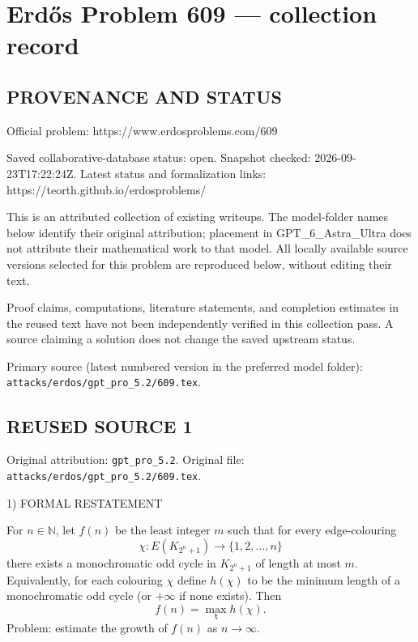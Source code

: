 \section*{Erd\H{o}s Problem 609 --- collection record}

\subsection*{PROVENANCE AND STATUS}
Official problem: https://www.erdosproblems.com/609

Saved collaborative-database status: open.
Snapshot checked: 2026-09-23T17:22:24Z.
Latest status and formalization links: https://teorth.github.io/erdosproblems/

This is an attributed collection of existing writeups. The model-folder names below identify their original attribution; placement in GPT\_6\_Astra\_Ultra does not attribute their mathematical work to that model. All locally available source versions selected for this problem are reproduced below, without editing their text.

Proof claims, computations, literature statements, and completion estimates in the reused text have not been independently verified in this collection pass. A source claiming a solution does not change the saved upstream status.

Primary source (latest numbered version in the preferred model folder): \texttt{attacks/erdos/gpt\_pro\_5.2/609.tex}.

\subsection*{REUSED SOURCE 1}
Original attribution: \texttt{gpt\_pro\_5.2}.
Original file: \texttt{attacks/erdos/gpt\_pro\_5.2/609.tex}.


1) FORMAL RESTATEMENT

For $n\in\mathbb N$, let $f(n)$ be the least integer $m$ such that for every edge-colouring
\[
\chi:E(K_{2^n+1})\to\{1,2,\dots,n\}
\]
there exists a monochromatic odd cycle in $K_{2^n+1}$ of length at most $m$.
Equivalently, for each colouring $\chi$ define $h(\chi)$ to be the minimum length of a monochromatic odd cycle (or $+\infty$ if none exists). Then
\[
f(n)=\max_{\chi} h(\chi).
\]
Problem: estimate the growth of $f(n)$ as $n\to\infty$.


